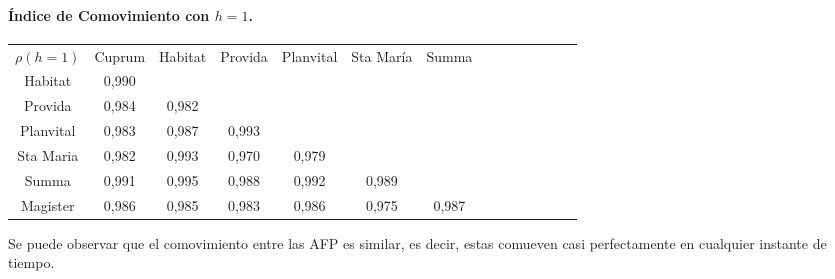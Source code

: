 \paragraph{\'Indice de Comovimiento con $h=1$.}
\begin{center}
\begin{small}
\begin{tabular}{|l|l|l|l|l|l|l|lllllll}
\cline{1-7}
\multicolumn{1}{|c|}{$\rho(h=1)$} & \multicolumn{1}{c|}{Cuprum} & \multicolumn{1}{c|}{Habitat} & \multicolumn{1}{c|}{Provida} & \multicolumn{1}{c|}{Planvital} & \multicolumn{1}{c|}{Sta Mar\'ia} & \multicolumn{1}{c|}{Summa} &  &  &  &  &  &  &  \\
\cline{1-7}
\multicolumn{1}{|c|}{Habitat} & \multicolumn{1}{c|}{0,990} & \multicolumn{1}{c|}{} & \multicolumn{1}{c|}{} & \multicolumn{1}{c|}{} & \multicolumn{1}{c|}{} & \multicolumn{1}{c|}{} &  &  &  &  &  &  &  \\
\cline{1-7}
\multicolumn{1}{|c|}{Provida} & \multicolumn{1}{c|}{0,984} & \multicolumn{1}{c|}{0,982} & \multicolumn{1}{c|}{} & \multicolumn{1}{c|}{} & \multicolumn{1}{c|}{} & \multicolumn{1}{c|}{} &  &  &  &  &  &  &  \\
\cline{1-7}
\multicolumn{1}{|c|}{Planvital} & \multicolumn{1}{c|}{0,983} & \multicolumn{1}{c|}{0,987} & \multicolumn{1}{c|}{0,993} & \multicolumn{1}{c|}{} & \multicolumn{1}{c|}{} & \multicolumn{1}{c|}{} &  &  &  &  &  &  &  \\
\cline{1-7}
\multicolumn{1}{|c|}{Sta Maria} & \multicolumn{1}{c|}{0,982} & \multicolumn{1}{c|}{0,993} & \multicolumn{1}{c|}{0,970} & \multicolumn{1}{c|}{0,979} & \multicolumn{1}{c|}{} & \multicolumn{1}{c|}{} &  &  &  &  &  &  &  \\
\cline{1-7}
\multicolumn{1}{|c|}{Summa} & \multicolumn{1}{c|}{0,991} & \multicolumn{1}{c|}{0,995} & \multicolumn{1}{c|}{0,988} & \multicolumn{1}{c|}{0,992} & \multicolumn{1}{c|}{0,989} & \multicolumn{1}{c|}{} &  &  &  &  &  &  &  \\
\cline{1-7}
\multicolumn{1}{|c|}{Magister} & \multicolumn{1}{c|}{0,986} & \multicolumn{1}{c|}{0,985} & \multicolumn{1}{c|}{0,983} & \multicolumn{1}{c|}{0,986} & \multicolumn{1}{c|}{0,975} & \multicolumn{1}{c|}{0,987} &  &  &  &  &  &  &  \\
\cline{1-7}
\end{tabular}
\end{small}
\end{center}

Se puede observar que el comovimiento  entre las AFP es similar, es decir, estas comueven casi perfectamente en cualquier instante de tiempo.

